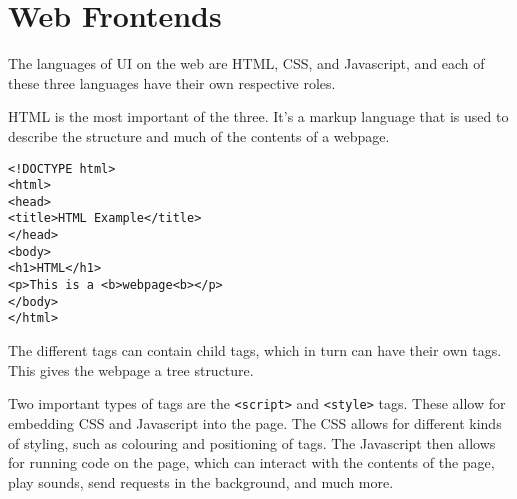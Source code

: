 \section{Web Frontends}
The languages of UI on the web are HTML, CSS, and Javascript, and each of these three languages have their own respective roles.\cite{nixonweb}

HTML is the most important of the three.
It's a markup language that is used to describe the structure and much of the contents of a webpage.
\begin{lstlisting}
<!DOCTYPE html>
<html>
<head>
<title>HTML Example</title>
</head>
<body>
<h1>HTML</h1>
<p>This is a <b>webpage<b></p>
</body>
</html>
\end{lstlisting}
The different tags can contain child tags, which in turn can have their own tags.
This gives the webpage a tree structure.

Two important types of tags are the \texttt{<script>} and \texttt{<style>} tags.
These allow for embedding CSS and Javascript into the page.
The CSS allows for different kinds of styling, such as colouring and positioning of tags.
The Javascript then allows for running code on the page, which can interact with the contents of the page, play sounds, send requests in the background, and much more.\cite{nixonweb}
